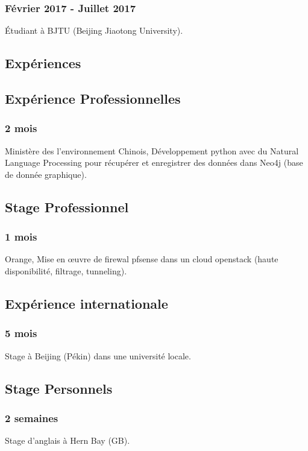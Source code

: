 \documentclass{article}
\begin{document}
        \subsubsection{F\'evrier 2017 - Juillet 2017}
            \'Etudiant \`a BJTU (Beijing Jiaotong University).

    \vspace{1cm}

    \begin{multicols}{2}
        \section{Exp\'eriences}
            \subsection{Exp\'erience Professionnelles}
                \subsubsection{2 mois}
                    Minist\`ere des l'environnement Chinois, D\'eveloppement python avec du Natural Language Processing pour r\'ecup\'erer et enregistrer des donn\'ees dans Neo4j (base de donnée graphique).
            \subsection{Stage Professionnel}
                \subsubsection{1 mois}
                    Orange, Mise en \oe{}uvre de firewal pfsense dans un cloud openstack (haute disponibilit\'e, filtrage, tunneling).
            \subsection{Exp\'erience internationale}
                \subsubsection{5 mois}
                    Stage \`a Beijing (P\'ekin) dans une universit\'e locale.
            \subsection{Stage Personnels}
                \subsubsection{2 semaines}
                    Stage d'anglais \`a Hern Bay (GB).

\end{multicols}
\end{document}
